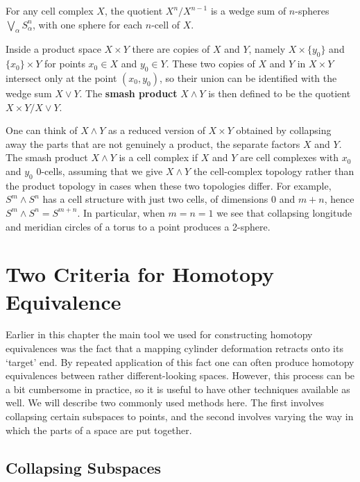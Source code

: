 For any cell complex $X$, the quotient $X^n/X^{n-1}$ is a wedge sum of $n$-spheres
$\bigvee_\alpha S_\alpha^n$, with one sphere for each $n$-cell of $X$.

\begin{definition}
\label{def:smash-product}
Inside a product space $X \times Y$ there are copies of $X$ and $Y$, namely
$X \times \{y_0\}$ and $\{x_0\} \times Y$ for points $x_0 \in X$ and $y_0 \in Y$. These two copies
of $X$ and $Y$ in $X \times Y$ intersect only at the point $(x_0,y_0)$, so their union can be
identified with the wedge sum $X \vee Y$. The \textbf{smash product} $X \wedge Y$ is then
defined to be the quotient $X \times Y / X \vee Y$.
\end{definition}

One can think of $X \wedge Y$ as a reduced version of $X \times Y$ obtained by collapsing
away the parts that are not genuinely a product, the separate factors $X$ and $Y$. The
smash product $X \wedge Y$ is a cell complex if $X$ and $Y$ are cell complexes with $x_0$
and $y_0$ 0-cells, assuming that we give $X \wedge Y$ the cell-complex topology rather than
the product topology in cases when these two topologies differ. For example,
$S^m \wedge S^n$ has a cell structure with just two cells, of dimensions 0 and $m+n$, hence
$S^m \wedge S^n = S^{m+n}$. In particular, when $m = n = 1$ we see that collapsing longitude
and meridian circles of a torus to a point produces a 2-sphere.

\section{Two Criteria for Homotopy Equivalence}
\label{sec:two-criteria-homotopy-equivalence}

Earlier in this chapter the main tool we used for constructing homotopy equivalences
was the fact that a mapping cylinder deformation retracts onto its `target' end. By
repeated application of this fact one can often produce homotopy equivalences between
rather different-looking spaces. However, this process can be a bit cumbersome in
practice, so it is useful to have other techniques available as well. We will describe two
commonly used methods here. The first involves collapsing certain subspaces to points,
and the second involves varying the way in which the parts of a space are put together.

\subsection*{Collapsing Subspaces}

